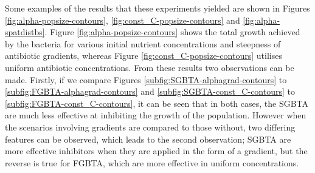 \documentclass[a4paper,12pt]{article}
\begin{document}
Some examples of the results that these experiments yielded are shown in Figures \ref{fig:alpha-popsize-contours}, \ref{fig:const_C-popsize-contours} and \ref{fig:alpha-spatdistbs}.  
Figure \ref{fig:alpha-popsize-contours} shows the total growth achieved by the bacteria for various initial nutrient concentrations and steepness of antibiotic gradients, whereas 
Figure \ref{fig:const_C-popsize-contours} utilises uniform antibiotic concentrations.  From these results two observations can be made.  Firstly, if we compare Figures 
\ref{subfig:SGBTA-alphagrad-contours} to \ref{subfig:FGBTA-alphagrad-contours} and \ref{subfig:SGBTA-const_C-contours} to \ref{subfig:FGBTA-const_C-contours}, it can be seen that 
in both cases, the SGBTA are much less effective at inhibiting the growth of the population.  However when the scenarios involving gradients are compared to those without, two 
differing features can be observed, which leads to the second observation; SGBTA are more effective inhibitors when they are applied in the form of a gradient, but the reverse is true 
for FGBTA, which are more effective in uniform concentrations.
\end{document}

